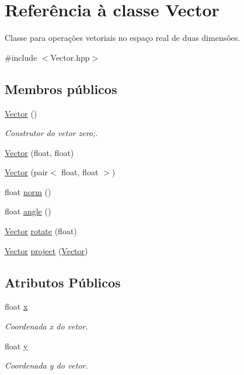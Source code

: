 \hypertarget{classVector}{}\section{Referência à classe Vector}
\label{classVector}


Classe para operações vetoriais no espaço real de duas dimensões.  




{\ttfamily \#include $<$Vector.\+hpp$>$}

\subsection*{Membros públicos}
\begin{DoxyCompactItemize}
\item 
\mbox{\label{classVector_a6f80c73b5f18dcf3f8e36065bdc8b9e5}} 
\hyperlink{classVector_a6f80c73b5f18dcf3f8e36065bdc8b9e5}{Vector} ()
\begin{DoxyCompactList}\small\item\em Construtor do vetor zero;. \end{DoxyCompactList}\item 
\hyperlink{classVector_a1d3e69fe5741740aa40e7b5fd2cbf0e8}{Vector} (float, float)
\item 
\hyperlink{classVector_abdb4dca6245e33a8661d1ab02bb50016}{Vector} (pair$<$ float, float $>$)
\item 
float \hyperlink{classVector_a4d643a71ea7c87cb77ab7bdfb26b42ba}{norm} ()
\item 
float \hyperlink{classVector_ac83edd3ce21c2eea555a360f64cf0acc}{angle} ()
\item 
\hyperlink{classVector}{Vector} \hyperlink{classVector_ac2e3094ce0134c3509ce4ef7df78245a}{rotate} (float)
\item 
\hyperlink{classVector}{Vector} \hyperlink{classVector_a7f187d9dc1da47c2d3754e8260a4c0e7}{project} (\hyperlink{classVector}{Vector})
\end{DoxyCompactItemize}
\subsection*{Atributos Públicos}
\begin{DoxyCompactItemize}
\item 
\mbox{\label{classVector_aca49165049a1e21ae47afcfc078819ed}} 
float \hyperlink{classVector_aca49165049a1e21ae47afcfc078819ed}{x}
\begin{DoxyCompactList}\small\item\em Coordenada x do vetor. \end{DoxyCompactList}\item 
\mbox{\label{classVector_a81be9102fca6d9beea3efef522c4c09d}} 
float \hyperlink{classVector_a81be9102fca6d9beea3efef522c4c09d}{y}
\begin{DoxyCompactList}\small\item\em Coordenada y do vetor. \end{DoxyCompactList}\end{DoxyCompactItemize}


